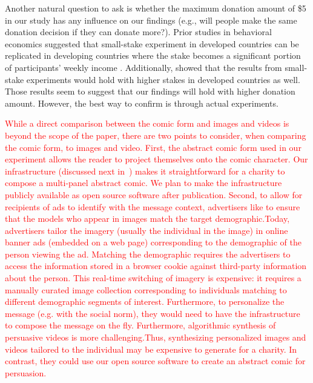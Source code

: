 \begin{description} [leftmargin=\parindent,topsep=0pt,partopsep=3pt,parsep=0pt,itemsep=3pt, listparindent=\parindent]
    \item[Donation Amount:] Another natural question to ask is whether the maximum donation amount of  \$5  in our study has any influence on our findings (e.g., will people make the same donation decision if they can donate more?).  Prior studies in behavioral economics suggested that small-stake experiment in developed countries can be replicated in developing countries where the stake becomes a significant portion of participants' weekly income \cite{binswanger1980attitudes,binswanger1981attitudes,kachelmeier1992examining}. Additionally, \textcite{post2008deal} showed that the results from small-stake experiments would hold with higher stakes in developed countries as well. Those results seem to suggest that our findings will hold with higher donation amount. However, the best way to confirm is through actual experiments. 
    \item[Other Media Forms:] \textcolor{red}{While a direct comparison between the comic form and images and videos is beyond the scope of the paper, there are two points to consider, when comparing the comic form, to images and video. First, the abstract comic form used in our experiment allows the reader to project themselves onto the comic character. Our infrastructure (discussed next in~) makes it straightforward for a charity to compose a multi-panel  abstract comic. We plan to make the infrastructure publicly available as open source software after publication. Second, to allow for recipients of ads to identify with the message context, advertisers like to ensure that the models who appear in images match the target demographic.Today, advertisers tailor the imagery (usually the individual in the image) in online banner ads (embedded on a web page) corresponding to the demographic of the person viewing the ad. Matching the demographic requires the advertisers to access the information stored in a browser cookie against third-party information about the person. This real-time switching of imagery is expensive: it requires a manually curated image collection corresponding to individuals matching to different demographic segments of interest. Furthermore, to personalize the message (e.g. with the social norm), they would need to have the infrastructure to compose the message on the fly. Furthermore, algorithmic synthesis of persuasive videos is more challenging.Thus, synthesizing personalized images and videos tailored to the individual may be expensive to generate for a charity. In contrast, they could use our open source software to create an abstract comic for persuasion.}

\end{description}
